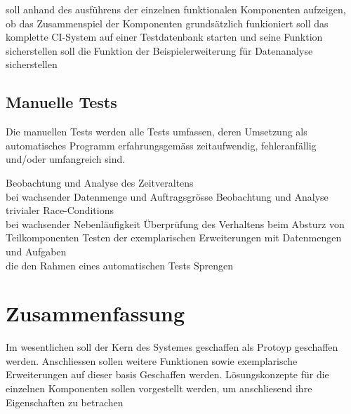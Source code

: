 \begin{description}
  \dhitem[Komponentendurchlauf]
    soll anhand des ausf\"uhrens der einzelnen funktionalen Komponenten
    aufzeigen, ob das Zusammenspiel der Komponenten
    grunds\"atzlich funkioniert
  \dhitem[Komplettstystem]
    soll das komplette CI-System auf einer Testdatenbank starten
    und seine Funktion sicherstellen
    soll die Funktion der Beispielerweiterung f\"ur Datenanalyse sicherstellen
\end{description}

\subsection{Manuelle Tests}

Die manuellen Tests werden alle Tests umfassen,
deren Umsetzung als automatisches Programm erfahrungsgem\"ass zeitaufwendig,
fehleranf\"allig und/oder umfangreich sind.


\begin{description}
    Beobachtung und Analyse des Zeitveraltens \\
    bei wachsender Datenmenge und Auftragsgr\"osse
    Beobachtung und Analyse trivialer Race-Conditions \\
    bei wachsender Nebenl\"aufigkeit
    \"Uberpr\"ufung des Verhaltens beim Absturz von Teilkomponenten
    Testen der exemplarischen Erweiterungen mit Datenmengen und Aufgaben \\
    die den Rahmen eines automatischen Tests Sprengen
\end{description}

\section{Zusammenfassung}


Im wesentlichen soll der Kern des Systemes geschaffen als Protoyp geschaffen werden.
Anschliessen sollen weitere Funktionen sowie exemplarische Erweiterungen
auf dieser basis Geschaffen werden.
L\"osungskonzepte f\"ur die einzelnen Komponenten sollen vorgestellt werden,
um anschliesend ihre Eigenschaften zu betrachen



